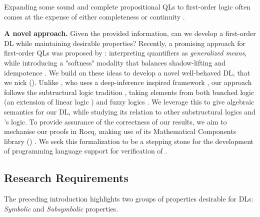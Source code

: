 Expanding some sound and complete propositional QLs to first-order logic often comes at the expense of either completeness or continuity \citep{cintula2011handbook, slusarz2023logic}.  

\textbf{A novel approach.} Given the provided information, can we develop a first-order DL while maintaining desirable properties?   Recently, a promising approach for first-order QLs was proposed by \citeauthor{capucci2024quantifiers}: interpreting quantifiers as \textit{generalized means}, while introducing a "softness" modality that balances shadow-lifting and idempotence \citep{capucci2024quantifiers}. We build on these ideas to develop a novel well-behaved DL, that we nick \emph{\OurLogic} (\OL). Unlike \citeauthor{capucci2024quantifiers}, who uses a deep-inference inspired framework \citep{guglielmi2007system, guglielmi2015deep}, our approach follows the subtructural logic tradition \citep{galatos2007residuated}, taking elements from both bunched logic \citep{o1999logic} (an extension of linear logic \citep{Wadler1993, agliano2025algebraic}) and fuzzy logics \citep{cintula2011handbook, prooffuzzy}. We leverage this to give algebraic semantics for our DL, while studying its relation to other substructural logics and \citeauthor{capucci2024quantifiers}'s logic. 
To provide assurance of the correctness of our results, we aim to mechanise our proofs in Rocq, making use of its Mathematical Components library (\mathcomp{}) \cite{mathcomp}. We seek this formalization to be a stepping stone for the development of programming language support for verification of \InAI{} \citep{vehicle}. 

\subsection{Research Requirements}
The preceding introduction highlights two groups of properties desirable for DLs: \emph{Symbolic} and \emph{Subsymbolic} properties. 

